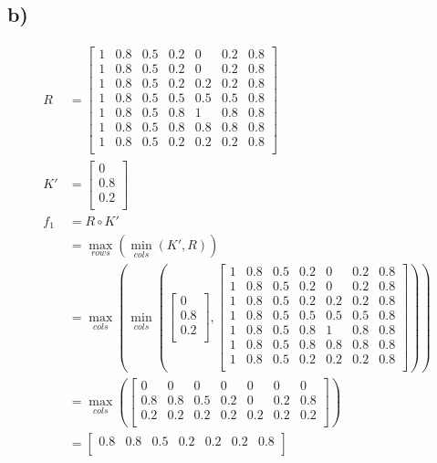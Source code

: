 \documentclass[12pt,a4paper]{article}
\begin{document}
\subsection*{b)}
\label{sub:b_}
\begin{align*}
	R &=\begin{bmatrix}
		1  & 0.8  & 0.5  & 0.2  & 0  & 0.2  & 0.8 \\
		1  & 0.8  & 0.5  & 0.2  & 0  & 0.2  & 0.8 \\
		1  & 0.8  & 0.5  & 0.2  & 0.2  & 0.2  & 0.8 \\
		1  & 0.8  & 0.5  & 0.5  & 0.5  & 0.5  & 0.8 \\
		1  & 0.8  & 0.5  & 0.8  & 1  & 0.8  & 0.8 \\
		1  & 0.8  & 0.5  & 0.8  & 0.8  & 0.8  & 0.8 \\
		1  & 0.8  & 0.5  & 0.2  & 0.2  & 0.2  & 0.8 \\
	\end{bmatrix}\\
	K' &=\begin{bmatrix}
		0\\
		0.8\\
		0.2\\
	\end{bmatrix}\\
	f_1 &= R \circ K'\\
		&= \max_{rows} \left(\min_{cols} \left(K', R\right)\right)\\
		&= \max_{cols} \left(\min_{cols} \left(
		\begin{bmatrix}
			0\\
			0.8\\
			0.2\\
		\end{bmatrix},
	\begin{bmatrix}
		1  & 0.8  & 0.5  & 0.2  & 0  & 0.2  & 0.8 \\
		1  & 0.8  & 0.5  & 0.2  & 0  & 0.2  & 0.8 \\
		1  & 0.8  & 0.5  & 0.2  & 0.2  & 0.2  & 0.8 \\
		1  & 0.8  & 0.5  & 0.5  & 0.5  & 0.5  & 0.8 \\
		1  & 0.8  & 0.5  & 0.8  & 1  & 0.8  & 0.8 \\
		1  & 0.8  & 0.5  & 0.8  & 0.8  & 0.8  & 0.8 \\
		1  & 0.8  & 0.5  & 0.2  & 0.2  & 0.2  & 0.8 \\
	\end{bmatrix}
		\right)
		\right)\\
	&= \max_{cols} \left(
	\begin{bmatrix}
		0 & 0 & 0 & 0 & 0 & 0 & 0\\
		0.8 & 0.8 & 0.5 & 0.2 & 0 & 0.2 & 0.8\\
		0.2 & 0.2 & 0.2 & 0.2 & 0.2 & 0.2 & 0.2\\
	\end{bmatrix}
		\right)\\
	&= \begin{bmatrix}
		0.8 & 0.8 & 0.5 & 0.2 & 0.2 & 0.2 & 0.8\\
		\end{bmatrix}\\
\end{align*}
\end{document}
